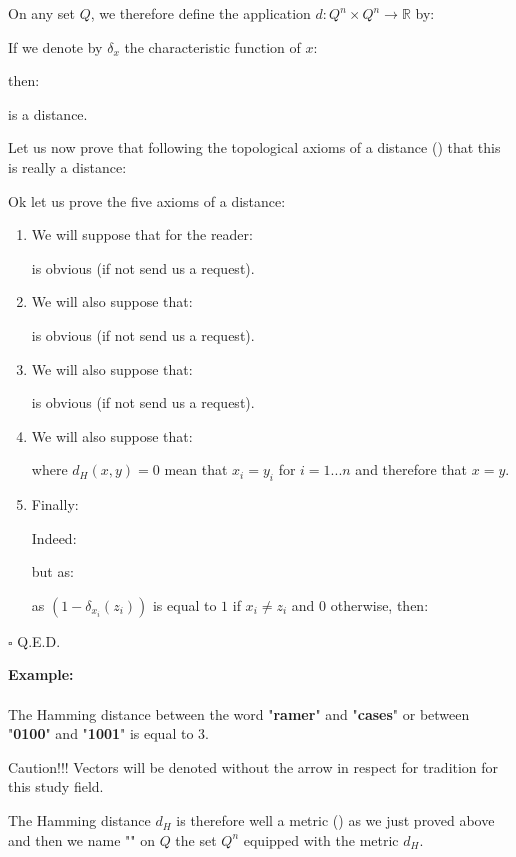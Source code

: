 	
	\begin{theorem}
	On any set $Q$, we therefore define the application $d:Q^n\times Q^n \rightarrow \mathbb{R}$ by:
	
	If we denote by $\delta_x$ the characteristic function of $x$:
	
	then:
	
	is a distance.
	\end{theorem}
	Let us now prove that following the topological axioms of a distance () that this is really a distance:
	\begin{dem}
	Ok let us prove the five axioms of a distance:
	\begin{enumerate}
		\item We will suppose that for the reader:
		
		is obvious (if not send us a request).
		
		\item We will also suppose that:
		
		is obvious (if not send us a request).
		
		\item We will also suppose that:
		
		is obvious (if not send us a request).
		
		\item We will also suppose that:
		
		where $d_H(x,y)=0$ mean that $x_i=y_i$ for $i=1...n$ and therefore that $x=y$.
		
		\item Finally:
		
		Indeed:
		
		but as:
		
		as $(1-\delta_{x_i}(z_i))$ is equal to $1$ if $x_i\neq z_i$ and $0$ otherwise, then:
		
	\end{enumerate}
	\begin{flushright}
		$\square$  Q.E.D.
	\end{flushright}
	\end{dem}
	\begin{tcolorbox}[colframe=black,colback=white,sharp corners]
	\textbf{{\Large {}}Example:}\\\\
	The Hamming distance between the word "\textbf{ramer}" and "\textbf{cases}" or between "\textbf{0100}" and "\textbf{1001}" is equal to $3$.
	\end{tcolorbox}
	\begin{tcolorbox}[title=Remark,colframe=black,arc=10pt]
	Caution!!! Vectors will be denoted without the arrow in respect for tradition for this study field.
	\end{tcolorbox}
	The Hamming distance $d_H$ is therefore well a metric () as we just proved above and then we name "" on $Q$ the set $Q^n$ equipped with the metric $d_H$.
		

